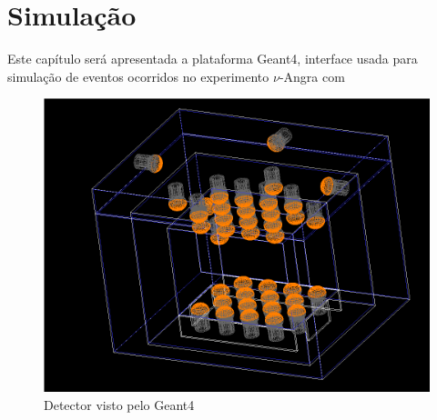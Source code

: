 \chapter{Simulação} \label{cap:simulacao}
\vspace{-2cm}

Este capítulo será apresentada a plataforma Geant4, interface usada para simulação de eventos ocorridos no experimento $\nu$-Angra com 

\begin{figure}[H]
    \centering
    \includegraphics[width=16cm]{textuais/simulacao/figuras/sim_det.png}
    \caption{Detector visto pelo Geant4}
    \label{fig:simdetector}
\end{figure}